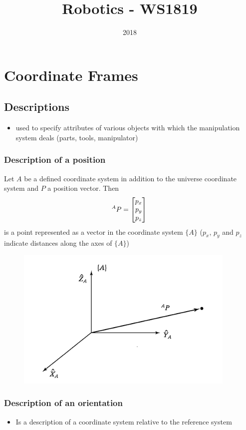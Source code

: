 \documentclass[10pt,a4paper]{article}
\title{Robotics - WS1819}
\author{}
\date{2018}
\newcommand{\vect}[1]{\ensuremath{\begin{bmatrix}#1\end{bmatrix}}}
\begin{document}
\tableofcontents
\newpage

\section{Coordinate Frames}

\subsection{Descriptions}
\begin{itemize}
	\item used to specify attributes of various objects with which the manipulation system deals (parts, tools, manipulator)
\end{itemize}

\subsubsection{Description of a position}
Let $A$ be a defined coordinate system in addition to the universe coordinate system and $P$ a position vector. Then \\
\begin{equation*}
^AP = \vect{p_x \\ p_y \\ p_z} \\
\end{equation*}
is a point represented as a vector in the coordinate system $\{A\}$ ($p_x$, $p_y$ and $p_z$ indicate distances along the axes of $\{A\}$)

\begin{figure}[H]
	\includegraphics[width=0.5\columnwidth]{imgs/position}
\end{figure}


\subsubsection{Description of an orientation}
\begin{itemize}
	\item Is a description of a coordinate system relative to the reference system
\end{itemize}
\end{document}
